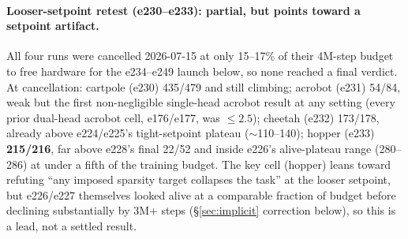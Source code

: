 \documentclass[10pt]{article}
\begin{document}
\paragraph{Looser-setpoint retest (e230--e233): partial, but points toward
a setpoint artifact.} All four runs were cancelled 2026-07-15 at only
15--17\% of their 4M-step budget to free hardware for the e234--e249 launch
below, so none reached a final verdict. At cancellation: cartpole (e230)
435/479 and still climbing; acrobot (e231) 54/84, weak but the first
non-negligible single-head acrobot result at any setting (every prior
dual-head acrobot cell, e176/e177, was $\le 2.5$); cheetah (e232) 173/178,
already above e224/e225's tight-setpoint plateau ($\sim$110--140); hopper
(e233) \textbf{215/216}, far above e228's final 22/52 and inside e226's
alive-plateau range (280--286) at under a fifth of the training budget.
The key cell (hopper) leans toward refuting ``any imposed sparsity target
collapses the task'' at the looser setpoint, but e226/e227 themselves
looked alive at a comparable fraction of budget before declining
substantially by 3M+ steps (\S\ref{sec:implicit} correction below), so this
is a lead, not a settled result.
\end{document}
